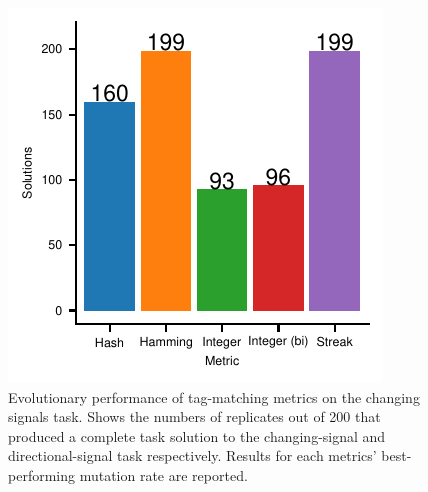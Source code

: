 \begin{figure}[!htbp]
\centering
\includegraphics[width=0.75\linewidth]{img/gp_results/panel-cst-sols.pdf}

\caption{
Evolutionary performance of tag-matching metrics on the changing signals task.
Shows the numbers of replicates out of 200 that produced a complete task solution to the changing-signal and directional-signal task respectively.
Results for each metrics' best-performing mutation rate are reported.
}

\label{fig:cst-sols}

\end{figure}
